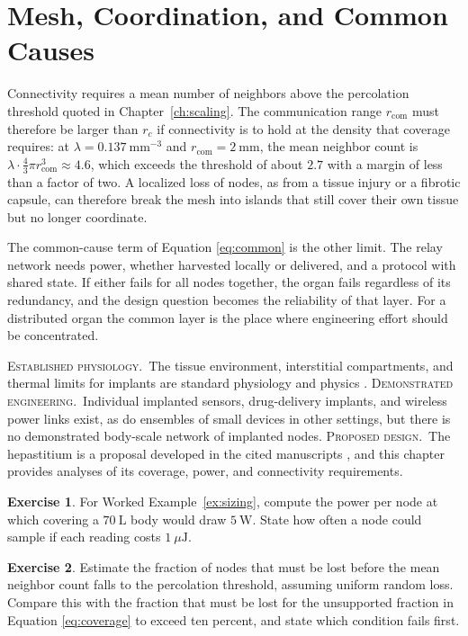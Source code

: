 \documentclass[11pt,openany]{book}
\theoremstyle{definition}
\newtheorem{exercise}{Exercise}[chapter]
\theoremstyle{remark}
\newcommand{\est}{\textsc{Established physiology.}\ }
\newcommand{\dem}{\textsc{Demonstrated engineering.}\ }
\newcommand{\pro}{\textsc{Proposed design.}\ }
\begin{document}
\section{Mesh, Coordination, and Common Causes}

Connectivity requires a mean number of neighbors above the percolation threshold quoted in Chapter~\ref{ch:scaling}. The communication range $r_{\mathrm{com}}$ must therefore be larger than $r_c$ if connectivity is to hold at the density that coverage requires: at $\lambda=0.137\ \mathrm{mm^{-3}}$ and $r_{\mathrm{com}}=2\ \mathrm{mm}$, the mean neighbor count is $\lambda\cdot\tfrac{4}{3}\pi r_{\mathrm{com}}^{3}\approx4.6$, which exceeds the threshold of about $2.7$ with a margin of less than a factor of two. A localized loss of nodes, as from a tissue injury or a fibrotic capsule, can therefore break the mesh into islands that still cover their own tissue but no longer coordinate.

The common-cause term of Equation \eqref{eq:common} is the other limit. The relay network needs power, whether harvested locally or delivered, and a protocol with shared state. If either fails for all nodes together, the organ fails regardless of its redundancy, and the design question becomes the reliability of that layer. For a distributed organ the common layer is the place where engineering effort should be concentrated.

\begin{evidence}
\est The tissue environment, interstitial compartments, and thermal limits for implants are standard physiology and physics \cite{boron2017,guyton2021}. \dem Individual implanted sensors, drug-delivery implants, and wireless power links exist, as do ensembles of small devices in other settings, but there is no demonstrated body-scale network of implanted nodes. \pro The hepastitium is a proposal developed in the cited manuscripts \cite{flyxion2026cm,flyxion2026hepastitium}, and this chapter provides analyses of its coverage, power, and connectivity requirements.
\end{evidence}

\begin{exercise}
For Worked Example~\ref{ex:sizing}, compute the power per node at which covering a $70\ \mathrm{L}$ body would draw $5\ \mathrm{W}$. State how often a node could sample if each reading costs $1\ \mu\mathrm{J}$.
\end{exercise}

\begin{exercise}
Estimate the fraction of nodes that must be lost before the mean neighbor count falls to the percolation threshold, assuming uniform random loss. Compare this with the fraction that must be lost for the unsupported fraction in Equation \eqref{eq:coverage} to exceed ten percent, and state which condition fails first.
\end{exercise}
\end{document}
